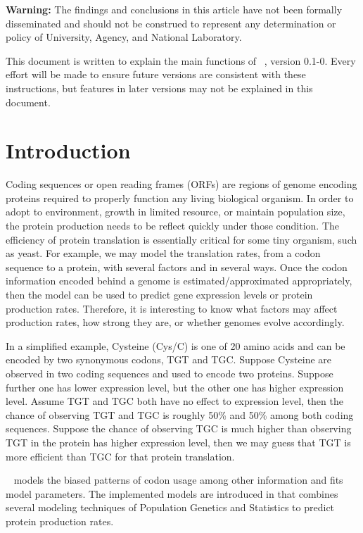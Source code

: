 
{\color{red} \bf Warning:}
The findings and conclusions in this article have not been
formally disseminated
and should not be construed to represent any determination or
policy of University, Agency, and National Laboratory.

This document is written to explain the main
functions of ~\citep{Chen2014cubfitspackage}, version 0.1-0.
Every effort will be made to ensure future versions are consistent with
these instructions, but features in later versions may not be explained
in this document.




\section[Introduction]{Introduction}
\label{sec:introduction}

Coding sequences or open reading frames (ORFs) are regions of genome encoding
proteins required to properly function any living biological organism.
In order to adopt to environment, growth in limited resource, or
maintain population size, the protein production needs to be reflect quickly
under those condition. The efficiency of protein translation is essentially
critical for some tiny organism, such as yeast.
For example, we may model the translation rates,
from a codon sequence to a protein,
with several factors and in several ways.
Once the codon information
encoded behind a genome is estimated/approximated appropriately, then
the model can be used to predict gene expression levels or protein production
rates. Therefore, it is interesting
to know what factors may affect production rates, how strong they are, or
whether genomes evolve accordingly.

In a simplified example, Cysteine (Cys/C) is one of 20 amino acids and
can be encoded by two synonymous codons, TGT and TGC. Suppose Cysteine are
observed in two coding sequences and used to encode two proteins.
Suppose further one has lower expression level, but the other one has higher
expression level. Assume TGT and TGC both have no effect to expression level,
then the chance of observing TGT and TGC is roughly 50\% and 50\% among
both coding sequences. Suppose the chance of observing TGC is much higher
than observing TGT in the protein has higher expression level, then we
may guess that TGT is more efficient than TGC for that protein translation.

~\citep{Chen2014cubfitspackage} models the biased patterns of codon usage among other
information and fits model parameters. The implemented models are introduced
in \citep{Gilchrist2007,Shah2011,Wallace2013}
that combines several
modeling techniques of Population Genetics and Statistics to
predict protein production rates.

